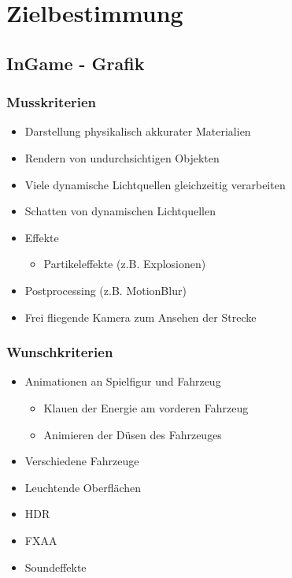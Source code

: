 \documentclass[parskip=full]{scrartcl}
\begin{document}
	\section{Zielbestimmung}

	\subsection{InGame - Grafik}
	\subsubsection{Musskriterien}
	\begin{itemize}
		\item Darstellung physikalisch akkurater Materialien
		\item Rendern von undurchsichtigen Objekten
		\item Viele dynamische Lichtquellen gleichzeitig verarbeiten
		\item Schatten von dynamischen Lichtquellen
		\item Effekte
		\begin{itemize}
			\item Partikeleffekte (z.B. Explosionen)
		\end{itemize}
		\item Postprocessing (z.B. \gls{MotionBlur})
		\item Frei fliegende Kamera zum Ansehen der Strecke
	\end{itemize}
	
	\subsubsection{Wunschkriterien}
	\begin{itemize}
		\item Animationen an Spielfigur und Fahrzeug
		\begin{itemize}
			\item Klauen der Energie am vorderen Fahrzeug
			\item Animieren der Düsen des Fahrzeuges
		\end{itemize}
			\item Verschiedene Fahrzeuge
		\item Leuchtende Oberflächen
		\item \gls{HDR}
		\item \gls{FXAA}
		\item Soundeffekte
	\end{itemize}
	
\end{document}
